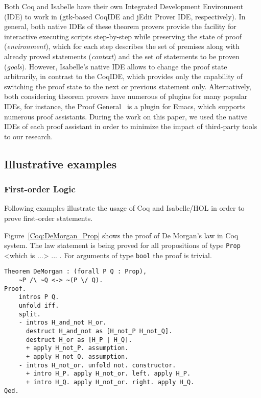 \documentclass[article]{aaltoseries}
\begin{document}
Both Coq and Isabelle have their own Integrated Development Environment (IDE) to work in (gtk-based CoqIDE and jEdit Prover IDE, respectively). In general, both native IDEs of these theorem provers provide the facility for interactive executing scripts step-by-step while preserving the state of proof (\textit{environment}), which for each step describes the set of premises along with already proved statements (\textit{context}) and the set of statements to be proven (\textit{goals}). However, Isabelle's native IDE allows to change the proof state arbitrarily, in contrast to the CoqIDE, which provides only the capability of switching the proof state to the next or previous statement only. Alternatively, both considering theorem provers have numerous of plugins for many popular IDEs, for instance, the Proof General~\cite{tool_PG} is a plugin for Emacs, which supports numerous proof assistants. During the work on this paper, we used the native IDEs of each proof assistant in order to minimize the impact of third-party tools to our research.



\subsection{Illustrative examples}

\subsubsection{First-order Logic}

Following examples illustrate the usage of Coq and Isabelle/HOL in order to prove first-order statements. 

Figure~\ref{Coq:DeMorgan_Prop} shows the proof of De Morgan's law in Coq system. The law statement is being proved for all propositions of type \texttt{Prop}  <which is ...> ... . For arguments of type \texttt{bool} the proof is trivial.

\begin{lstlisting}[caption={Propositional logic proof: de Morgan's law for propositions},label={Coq:DeMorgan_Prop}]
Theorem DeMorgan : (forall P Q : Prop),
    ~P /\ ~Q <-> ~(P \/ Q).
Proof.
    intros P Q.
    unfold iff.
    split.
	- intros H_and_not H_or.
	  destruct H_and_not as [H_not_P H_not_Q].
	  destruct H_or as [H_P | H_Q].
      + apply H_not_P. assumption.
      + apply H_not_Q. assumption.
    - intros H_not_or. unfold not. constructor.
      + intro H_P. apply H_not_or. left. apply H_P.
      + intro H_Q. apply H_not_or. right. apply H_Q.
Qed.
\end{lstlisting}
\end{document}
